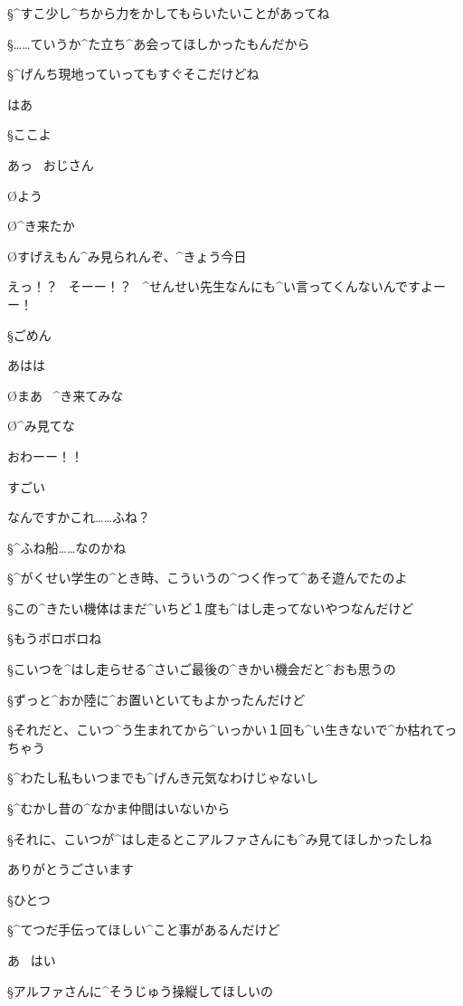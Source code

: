 \S ^{すこ}{少}し^{ちから}{力}をかしてもらいたいことがあってね

\S ……ていうか^{た}{立}ち^{あ}{会}ってほしかったもんだから

\page
\S ^{げんち}{現地}っていってもすぐそこだけどね

\A はあ

\S ここよ

\page
\A あっ
\ おじさん

\O よう

\page
\O ^{き}{来}たか

\O すげえもん^{み}{見}られんぞ、^{きょう}{今日}

\A えっ！？
\ そーー！？
\ ^{せんせい}{先生}なんにも^{い}{言}ってくんないんですよーー！

\S ごめん

\A あはは

\O まあ
\ ^{き}{来}てみな

\O ^{み}{見}てな

\page
\A おわーー！！

\page
\A すごい

\A なんですかこれ……ふね？

\S ^{ふね}{船}……なのかね

\S ^{がくせい}{学生}の^{とき}{時}、こういうの^{つく}{作}って^{あそ}{遊}んでたのよ

\S この^{きたい}{機体}はまだ^{いちど}{１度}も^{はし}{走}ってないやつなんだけど

\S もうボロボロね

\S こいつを^{はし}{走}らせる^{さいご}{最後}の^{きかい}{機会}だと^{おも}{思}うの

\page
\S ずっと^{おか}{陸}に^{お}{置}いといてもよかったんだけど

\S それだと、こいつ^{う}{生}まれてから^{いっかい}{１回}も^{い}{生}きないで^{か}{枯}れてっちゃう

\S ^{わたし}{私}もいつまでも^{げんき}{元気}なわけじゃないし

\S ^{むかし}{昔}の^{なかま}{仲間}はいないから

\S それに、こいつが^{はし}{走}るとこアルファさんにも^{み}{見}てほしかったしね

\page
\A ありがとうごさいます

\S ひとつ

\S ^{てつだ}{手伝}ってほしい^{こと}{事}があるんだけど

\A あ
\ はい

\S アルファさんに^{そうじゅう}{操縦}してほしいの

